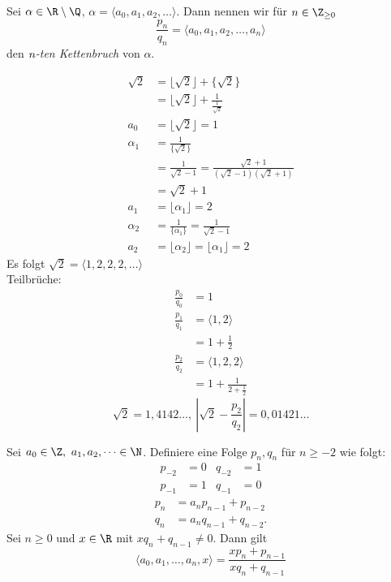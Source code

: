 \begin{defn*}[Teilbruch]
	Sei $\alpha \in \R \setminus \Q$, $\alpha = \langle a_0,a_1,a_2,\dotsc \rangle$. Dann nennen wir für $n \in \Z_{\geq0}$
	\[ \frac{p_n}{q_n} = \langle a_0,a_1,a_2,\dotsc,a_n \rangle \]
	den \emph{$\emph{n}$-ten Kettenbruch} von $\alpha$.
\end{defn*}

\begin{exmp*}
	\begin{align*}
		\sqrt{2} &= \lfloor \sqrt{2}\rfloor + \{\sqrt{2}\}\\
		&= \lfloor \sqrt{2}\rfloor + \frac{1}{\frac{1}{\sqrt{2}}}\\
		a_0 &= \lfloor \sqrt{2} \rfloor = 1\\
		\alpha_1 &= \frac{1}{\{\sqrt{2}\}}\\
		&= \frac{1}{\sqrt{2} - 1} = \frac{\sqrt{2}+1}{(\sqrt{2} - 1)(\sqrt{2} + 1)}\\
		&= \sqrt{2} + 1\\
		a_1 &= \lfloor \alpha_1 \rfloor = 2\\
		\alpha_2 &= \frac{1}{\{ \alpha_1 \}} = \frac{1}{\sqrt{2} - 1}\\
		a_2 &= \lfloor \alpha_2 \rfloor = \lfloor \alpha_1 \rfloor = 2
	\end{align*}
	Es folgt $\sqrt{2} = \langle 1,2,2,2,\dotsc \rangle$\\
	Teilbrüche:
	\begin{align*}
		\frac{p_0}{q_0} &= 1 \\
		\frac{p_1}{q_1} &= \langle 1,2\rangle\\
		&= 1 + \frac{1}{2}\\
		\frac{p_2}{q_2} &= \langle 1,2,2\rangle\\
		&= 1 + \frac{1}{2 + \frac{1}{2}}
	\end{align*}
	\[ \sqrt{2} = 1,4142\dots,\ \left| \sqrt{2} - \frac{p_2}{q_2} \right| = 0,01421\dots \]
\end{exmp*}

\begin{thm}\autolabel
	Sei $a_0 \in \Z,\ a_1,a_2,\dots \in \N$. Definiere eine Folge $p_n,q_n$ für $n \geq -2$ wie folgt:
	\begin{align*}
		p_{-2} &= 0	&	q_{-2} &= 1\\
		p_{-1} &= 1 &	q_{-1} &= 0
	\end{align*}
	\begin{align*}
		p_n &= a_n p_{n-1} + p_{n-2}\\
		q_n &= a_n q_{n-1} + q_{n-2}.
	\end{align*}
	Sei $n \geq 0$ und $x \in \R$ mit $x q_n + q_{n-1} \neq 0$. Dann gilt
	\[ \langle a_0,a_1,\dotsc,a_n,x\rangle = \frac{x p_n + p_{n-1}}{x q_n + q_{n-1}} \]
\end{thm}

